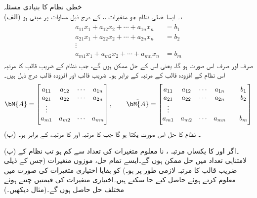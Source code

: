 \quad خطی نظام کا بنیادی مسئلہ\\
(الف) ۔ ایسا خطی نظام جو  متغیرات ،، کے درج ذیل  مساوات پر مبنی ہو،
\begin{gather}
\begin{aligned}\label{مساوات_الجبرا_نظام_وجودیت_یکتائی_حل_الف}
a_{11}x_1+a_{12}x_2+\cdots+a_{1n}x_n&=b_1\\
a_{21}x_1+a_{22}x_2+\cdots+a_{2n}x_n&=b_2\\
\vdots\\
a_{m1}x_1+a_{m2}x_2+\cdots+a_{mn}x_n&=b_m
\end{aligned}
\end{gather}
صرف اور صرف اس صورت  ہو گا، یعنی اس کے حل ممکن ہوں گے، جب  نظام کے  ضریب  قالب  کا مرتبہ اس نظام کے افزودہ قالب  کے مرتبہ کے برابر ہو۔  ضریب  قالب اور افزودہ قالب درج ذیل ہیں۔
\begin{align*}
\bM{A}=
\begin{bmatrix} 
a_{11}&a_{12}&\cdots & a_{1n}\\
a_{21}&a_{22}&\cdots & a_{2n}\\
\vdots\\
a_{m1}&a_{m2}&\cdots & a_{mn}
\end{bmatrix},\quad \quad \tilde{\bM{A}}=
\begin{bmatrix} 
a_{11}&a_{12}&\cdots & a_{1n}&& b_1\\
a_{21}&a_{22}&\cdots & a_{2n}&& b_2\\
\vdots\\
a_{m1}&a_{m2}&\cdots & a_{mn}&&b_m
\end{bmatrix}
\end{align*}
(ب) ۔ نظام  کا حل اس صورت یکتا ہو گا جب  کا مرتبہ اور  کا مرتبہ،  کے برابر ہو۔ 

(پ) ۔اگر  اور  کا یکساں مرتبہ ، نا معلوم متغیرات کی تعداد  سے کم ہو تب نظام  کے لامتناہی تعداد میں حل ممکن ہوں گے۔ایسے تمام حل،  موزوں متغیرات (جس کے ذیلی  ضریب  قالب کا مرتبہ لازمی طور پر ہو۔) کو بقایا  اختیاری متغیرات  کی صورت میں معلوم کرتے ہوئے حاصل کیے جا سکتے ہیں۔اختیاری متغیرات کی قیمتیں چنتے ہوئے مختلف حل حاصل ہوں گے۔(مثال  دیکھیں۔)

